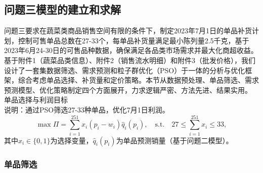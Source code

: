 \documentclass{cumcmthesis} %
\begin{document}
\subsection{问题三模型的建立和求解}
问题三要求在蔬菜类商品销售空间有限的条件下，制定2023年7月1日的单品补货计划，控制可售单品总数在27-33个，每单品补货量满足最小陈列量2.5千克，基于2023年6月24-30日的可售品种数据，确保满足各品类市场需求并最大化商超收益。基于附件1（蔬菜品类信息）、附件2（销售流水明细）和附件3（批发价格），我们设计了一套集数据筛选、需求预测和粒子群优化（PSO）于一体的分析与优化框架，综合考虑单品选择、补货量和定价策略。本节从数据预处理、单品筛选、需求预测模型、优化策略制定四个方面展开，力求逻辑严密、方法先进、结果实用。
单品选择与利润目标 \\
   说明：通过PSO筛选27-33种单品，优化7月1日利润。
   \begin{equation}
   \max \Pi = \sum_{i=1}^{251} x_i (p_i - w_i) \hat{q}_i(p_i), \quad \text{s.t.} \quad 27 \leq \sum_{i=1}^{251} x_i \leq 33,
   \end{equation}
   其中$x_i \in \{0,1\}$为选择变量，$\hat{q}_i(p_i)$为单品预测销量（基于问题二模型）。

\subsubsection{单品筛选}
\end{document}
